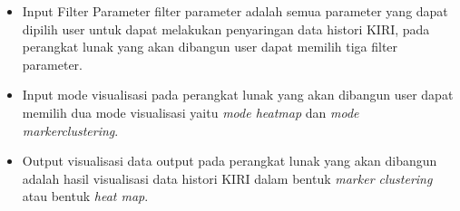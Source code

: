 \begin{itemize}
    \item Input Filter Parameter filter parameter adalah semua parameter yang  dapat dipilih user untuk dapat melakukan penyaringan data histori KIRI, pada perangkat lunak yang akan dibangun user dapat memilih tiga filter parameter.
    
    \item Input mode visualisasi pada perangkat lunak yang akan dibangun user dapat memilih dua mode visualisasi yaitu \textit{mode heatmap} dan \textit{mode markerclustering}.
    
    \item Output visualisasi data output pada perangkat lunak yang akan dibangun adalah hasil visualisasi data histori KIRI dalam bentuk \textit{marker clustering} atau bentuk \textit{heat map}.
\end{itemize}